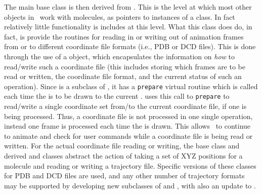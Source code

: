 The main base class  is then derived from .  This is the level at which most other objects in \VMD\ work with molecules, as pointers to instances of a  class.  In fact relatively little functionality is includes at this level.  What this class does do, in fact, is provide the routines for reading in or writing out of animation frames from or to different coordinate file formats (i.e., PDB or DCD files).  This is done through the use of a  object, which encapsulates the information on {\em how} to read/write such a coordinate file (this includes storing which frames are to be read or written, the coordinate file format, and the current status of such an operation).  Since  is a subclass of , it has a {\tt prepare} virtual routine which is called each time the  is to be drawn to the current .   uses this call to {\tt prepare} to read/write a single coordinate set from/to the current coordinate file, if one is being processed.  Thus, a coordinate file is not processed in one single operation, instead one frame is processed each time the  is drawn.  This allows \VMD\ to continue to animate and check for user commands while a coordinate file is being read or written.  For the actual coordinate file reading or writing, the  base class and derived  and  classes abstract the action of taking a set of XYZ positions for a molecule and reading or writing a trajectory file.  Specific versions of these classes for PDB and DCD files are used, and any other number of trajectory formats may be supported by developing new subclasses of  and , with also an update to .

